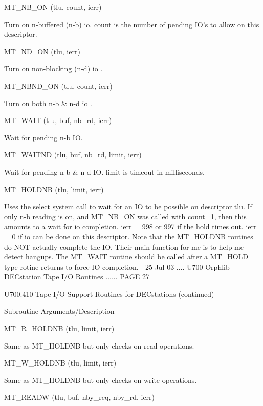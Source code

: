    MT_NB_ON           (tlu, count, ierr)
 
                       Turn on n-buffered (n-b) io. count is the number
                       of pending IO's to allow on this descriptor.
 
   MT_ND_ON           (tlu, ierr)
 
                       Turn on non-blocking (n-d) io .
 
   MT_NBND_ON         (tlu, count, ierr)
 
                       Turn on both n-b & n-d io .
 
   MT_WAIT            (tlu, buf, nb_rd, ierr)
 
                       Wait for pending n-b IO.
 
   MT_WAITND          (tlu, buf, nb_rd, limit, ierr)
 
                       Wait for pending n-b & n-d IO.  limit is timeout
                       in milliseconds.
 
   MT_HOLDNB          (tlu, limit, ierr)
 
                       Uses the select system call to wait for an IO to be
                       possible on descriptor tlu.
                       If only n-b reading is on, and MT_NB_ON was called with
                       count=1, then this amounts to a wait for io completion.
                       ierr = 998 or 997 if the hold times out.
                       ierr = 0 if io can be done on this descriptor.
                       Note that the MT_HOLDNB routines do NOT actually complete
                       the IO. Their main function for me is to help me detect
                       hangups. The MT_WAIT routine should be called after a
                       MT_HOLD type rotine returns to force IO completion.
    
   25-Jul-03 .... U700  Orphlib - DECstation Tape I/O Routines ...... PAGE  27
 
 
   U700.410  Tape I/O Support Routines for DECstations (continued)
 
 
   Subroutine          Arguments/Description
 
   MT_R_HOLDNB        (tlu, limit, ierr)
 
                       Same as MT_HOLDNB but only checks on read operations.
 
   MT_W_HOLDNB        (tlu, limit, ierr)
 
                       Same as MT_HOLDNB but only checks on write operations.
 
   MT_READW           (tlu, buf, nby_req, nby_rd, ierr)
 
